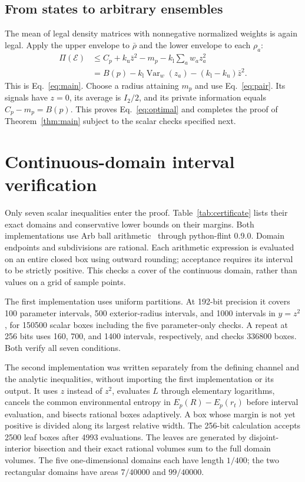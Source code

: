 \documentclass[aps,pra,reprint,amsmath,amssymb,longbibliography,nofootinbib]{revtex4-2}
\newcommand{\Var}{\operatorname{Var}}
\newcommand{\cE}{\mathcal E}
\newcommand{\kl}{k_{\mathrm l}}
\newcommand{\ku}{k_{\mathrm u}}
\begin{document}
\subsection{From states to arbitrary ensembles}
The mean of legal density matrices with nonnegative normalized weights is again legal. Apply the upper envelope to $\bar\rho$ and the lower envelope to each $\rho_a$:
\begin{align}
 \Pi(\cE)&\le C_p+\ku\bar z^2-m_p-\kl\sum_aw_az_a^2\nonumber\\
 &=B(p)-\kl\Var_w(z_a)-(\kl-\ku)\bar z^2.
 \label{eq:ensembleproof}
\end{align}
This is Eq.~\eqref{eq:main}. Choose a radius attaining $m_p$ and use Eq.~\eqref{eq:pair}. Its signals have $z=0$, its average is $I_2/2$, and its private information equals $C_p-m_p=B(p)$. This proves Eq.~\eqref{eq:optimal} and completes the proof of Theorem~\ref{thm:main} subject to the scalar checks specified next.

\section{Continuous-domain interval verification}\label{sec:certificate}
Only seven scalar inequalities enter the proof. Table~\ref{tab:certificate} lists their exact domains and conservative lower bounds on their margins. Both implementations use Arb ball arithmetic~\cite{Johansson2017} through python-flint 0.9.0. Domain endpoints and subdivisions are rational. Each arithmetic expression is evaluated on an entire closed box using outward rounding; acceptance requires its interval to be strictly positive. This checks a cover of the continuous domain, rather than values on a grid of sample points.



The first implementation uses uniform partitions. At 192-bit precision it covers 100 parameter intervals, 500 exterior-radius intervals, and 1000 intervals in $y=z^2$, for 150500 scalar boxes including the five parameter-only checks. A repeat at 256 bits uses 160, 700, and 1400 intervals, respectively, and checks 336800 boxes. Both verify all seven conditions.

The second implementation was written separately from the defining channel and the analytic inequalities, without importing the first implementation or its output. It uses $z$ instead of $z^2$, evaluates $L$ through elementary logarithms, cancels the common environmental entropy in $E_p(R)-E_p(r_t)$ before interval evaluation, and bisects rational boxes adaptively. A box whose margin is not yet positive is divided along its largest relative width. The 256-bit calculation accepts 2500 leaf boxes after 4993 evaluations. The leaves are generated by disjoint-interior bisection and their exact rational volumes sum to the full domain volumes. The five one-dimensional domains each have length $1/400$; the two rectangular domains have areas $7/40000$ and $99/40000$.
\end{document}

